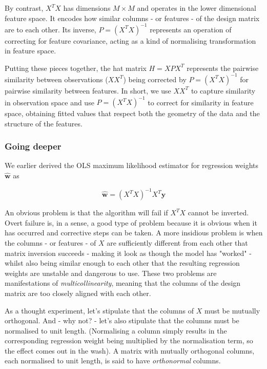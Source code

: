 \documentclass[11pt]{article}
\begin{document}
	By contrast, $X^{T}X$ has dimensions $M \times M$ and operates in the lower dimensional feature space. It encodes how similar columns - or features - of the design matrix are to each other. Its inverse, $P = (X^{T}X)^{-1}$ represents an operation of correcting for feature covariance, acting as a kind of normalising transformation in feature space.
	
	Putting these pieces together, the hat matrix $H = XPX^{T}$ represents the pairwise similarity between observations ($XX^{T}$) being corrected by $P = (X^{T}X)^{-1}$ for pairwise similarity between features. In short, we use $XX^{T}$ to capture similarity in observation space and use $P = (X^{T}X)^{-1}$ to correct for similarity in feature space, obtaining fitted values that respect both the geometry of the data and the structure of the features.
	
	\subsubsection{Going deeper}
	
	We earlier derived the OLS maximum likelihood estimator for regression weights $\boldsymbol{\hat{w}}$ as 
	
	\begin{equation*}
		\boldsymbol{\hat{w}} = (X^{T}X)^{-1}X^{T}\boldsymbol{y}
	\end{equation*}
	
	An obvious problem is that the algorithm will fail if $X^{T}X$ cannot be inverted. Overt failure is, in a sense, a good type of problem because it is obvious when it has occurred and corrective steps can be taken. A more insidious problem is when the columns - or features - of $X$ are sufficiently different from each other that matrix inversion succeeds - making it look as though the model has "worked" - whilst also being similar enough to each other that the resulting regression weights are unstable and dangerous to use. These two problems are manifestations of \emph{multicollinearity}, meaning that the columns of the design matrix are too closely aligned with each other.
	
	As a thought experiment, let's stipulate that the columns of $X$ must be mutually orthogonal. And - why not? - let's also stipulate that the columns must be normalised to unit length. (Normalising a column simply results in the corresponding regression weight being multiplied by the normalisation term, so the effect comes out in the wash). A matrix with mutually orthogonal columns, each normalised to unit length, is said to have \emph{orthonormal} columns.
	
\end{document}
